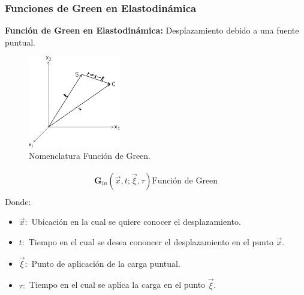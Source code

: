 \begin{frame}[allowframebreaks]
\frametitle{Funciones de Green en Elastodinámica}
%
\justifying
%
\textbf{Función de Green en Elastodinámica:} Desplazamiento debido a una fuente puntual.
%
\begin{figure}[h]
	\centering
	\includegraphics[height=4cm]{img/Figure1.pdf}
	\caption{Nomenclatura Función de Green. \cite[figura 9.1, página 280]{book:pujol}}
	\vspace{-.5 cm}
\end{figure}
%
\begin{align*}
	\mathbf{G}_{in} \left( \vec{x}, t; \vec{\xi}, \tau \right) \text{Función de Green}\\
\end{align*}
%
Donde:
%
\begin{itemize}
%
	\item $\vec{x}:$ Ubicación en la cual se quiere conocer el desplazamiento.
	\item $t:$ Tiempo en el cual se desea cononcer el desplazamiento en el punto $\vec{x}$.
	\item $\vec{\xi}:$ Punto de aplicación de la carga puntual.
	\item $\tau:$ Tiempo en el cual se aplica la carga en el punto $\vec{\xi}$.
%
\end{itemize}
%
%
\end{frame}
%
%
